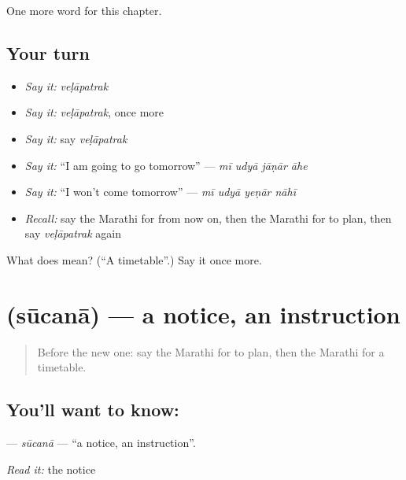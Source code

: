 \begin{grammarlens}[title={What you've built}]
One more word for this chapter.
\end{grammarlens}

\subsection*{Your turn}
\begin{itemize}
\raggedright
  \item \emph{Say it:} \emph{veḷāpatrak}
  \item \emph{Say it:} \emph{veḷāpatrak}, once more
  \item \emph{Say it:} say \emph{veḷāpatrak}
  \item \emph{Say it:} \textquotedblleft{}I am going to go tomorrow\textquotedblright{} — \emph{mī udyā jāṇār āhe}
  \item \emph{Say it:} \textquotedblleft{}I won't come tomorrow\textquotedblright{} — \emph{mī udyā yeṇār nāhī}
  \item \emph{Recall:} say the Marathi for from now on, then the Marathi for to plan, then say \emph{veḷāpatrak} again
\end{itemize}

\begin{tcolorbox}[breakable,colback=teal!4,colframe=teal!35!black,title={Before you move on}]
What does  mean? (\textquotedblleft{}A timetable\textquotedblright{}.) Say it once more.
\end{tcolorbox}
\section[\texorpdfstring{\mr{सूचना} (sūcanā)}{सूचना (sūcanā)}]{ (sūcanā) — a notice, an instruction}

\label{lesson:MR-C161-sucana}



\begin{quote}
Before the new one: say the Marathi for to plan, then the Marathi for a timetable.
\end{quote}

\subsection*{You'll want to know: }
\textbf{} — \emph{sūcanā} — \textquotedblleft{}a notice, an instruction\textquotedblright{}.

\emph{Read it:} the notice

